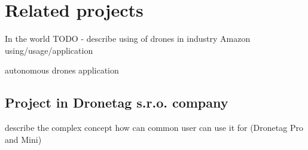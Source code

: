 \chapter{Related projects}\label{ch:related-projects}

In the world TODO - describe using of drones in industry
Amazon using/usage/application

autonomous drones application

\section{Project in Dronetag s.r.o. company}\label{sec:project-in-dronetag-s.r.o.-company}
describe the complex concept how can common user can use it for (Dronetag Pro and Mini)
